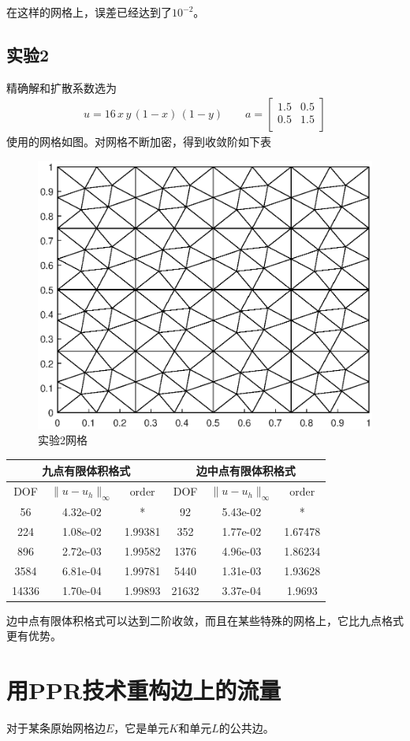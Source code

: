 \documentclass[12pt,a4paper]{article}
\theoremstyle{plain}
\begin{document}
在这样的网格上，误差已经达到了$10^{-2}$。

\subsection*{实验2}

精确解和扩散系数选为
\begin{align*}
u = 16 \, x \, y \, (1-x) \, (1-y) \qquad
a = \left[
\begin{matrix}
1.5 & 0.5 \\
0.5 & 1.5 \\
\end{matrix}
\right]
\end{align*}
使用的网格如图。对网格不断加密，得到收敛阶如下表
\begin{figure}[H]
\centering
\includegraphics[width=0.4\linewidth]{mesh2}
\caption{实验2网格}
\end{figure}

\begin{table}
\centering
\begin{tabular}{ccc|ccc}
\multicolumn{3}{c}{九点有限体积格式}  & \multicolumn{3}{c}{边中点有限体积格式} \\
\hline
DOF & $\|u - u_h\|_{\infty}$ & order & DOF & $\|u - u_h\|_{\infty}$ & order \\
\hline
56 & 4.32e-02 & * & 92 & 5.43e-02 & * \\
224 & 1.08e-02 & 1.99381 & 352 & 1.77e-02 & 1.67478 \\
896 & 2.72e-03 & 1.99582 & 1376 & 4.96e-03 & 1.86234 \\
3584 & 6.81e-04 & 1.99781 & 5440 & 1.31e-03 & 1.93628 \\
14336 & 1.70e-04 & 1.99893 & 21632 & 3.37e-04 & 1.9693 \\
\hline
\end{tabular}
\end{table}

边中点有限体积格式可以达到二阶收敛，而且在某些特殊的网格上，它比九点格式更有优势。

\section*{用PPR技术重构边上的流量}

对于某条原始网格边$E$，它是单元$K$和单元$L$的公共边。



%
%
\end{document}

